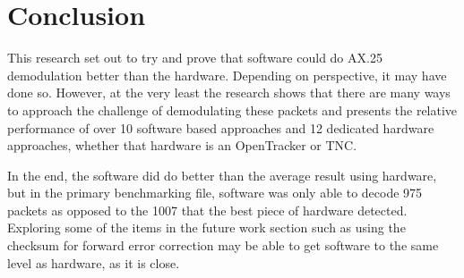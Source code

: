 \chapter{Conclusion}
This research set out to try and prove that software could do AX.25 demodulation better than the hardware. Depending on perspective, it may have done so. However, at the very least the research shows that there are many ways to approach the challenge of demodulating these packets and presents the relative performance of over 10 software based approaches and 12 dedicated hardware approaches, whether that hardware is an OpenTracker or TNC.

In the end, the software did do better than the average result using hardware, but in the primary benchmarking file, software was only able to decode 975 packets as opposed to the 1007 that the best piece of hardware detected. Exploring some of the items in the future work section such as using the checksum for forward error correction may be able to get software to the same level as hardware, as it is close.